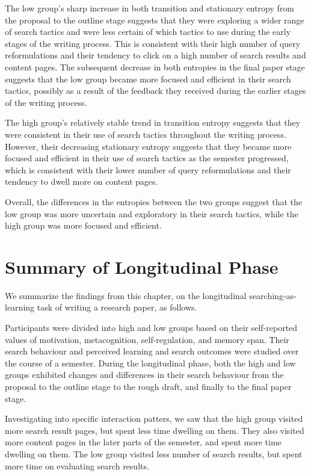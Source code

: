 \documentclass[letterpaper, nobind]{templates/ociamthesis}
\begin{document}
The low group's sharp increase in both transition and stationary entropy from the proposal to the outline stage suggests that they were exploring a wider range of search tactics and were less certain of which tactics to use during the early stages of the writing process.
This is consistent with their high number of query reformulations and their tendency to click on a high number of search results and content pages.
The subsequent decrease in both entropies in the final paper stage suggests that the low group became more focused and efficient in their search tactics, possibly as a result of the feedback they received during the earlier stages of the writing process.

The high group's relatively stable trend in transition entropy suggests that they were consistent in their use of search tactics throughout the writing process.
However, their decreasing stationary entropy suggests that they became more focused and efficient in their use of search tactics as the semester progressed, which is consistent with their lower number of query reformulations and their tendency to dwell more on content pages.

Overall, the differences in the entropies between the two groups suggest that the low group was more uncertain and exploratory in their search tactics, while the high group was more focused and efficient.

\hypertarget{summary-of-longitudinal-phase}{%
\section{Summary of Longitudinal Phase}\label{summary-of-longitudinal-phase}}

We summarize the findings from this chapter, on the longitudinal searching-as-learning task of writing a research paper, as follows.

Participants were divided into high and low groups based on their self-reported values of motivation, metacognition, self-regulation, and memory span.
Their search behaviour and perceived learning and search outcomes were studied over the course of a semester.
During the longitudinal phase, both the high and low groups exhibited changes and differences in their search behaviour from the proposal to the outline stage to the rough draft, and finally to the final paper stage.

Investigating into specific interaction patters, we saw that the high group visited more search result pages, but spent less time dwelling on them. They also visited more content pages in the later parts of the semester, and spent more time dwelling on them.
The low group visited less number of search results, but spent more time on evaluating search results.
\end{document}
